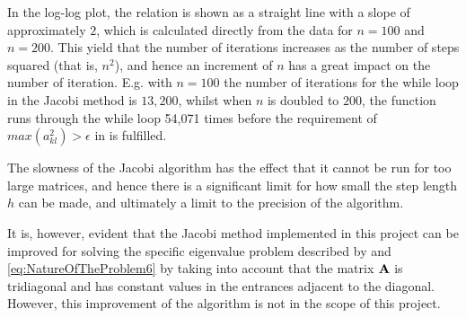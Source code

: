 In the log-log plot, the relation is shown as a straight line with a slope of approximately $2$, which is calculated directly from the data for $n=100$ and $n=200$.
This yield that the number of iterations increases as the number of steps squared (that is, $n^2$), and hence an increment of $n$ has a great impact on the number of iteration. 
E.g. with $n=100$ the number of iterations for the while loop in the Jacobi method is $13,200$, whilst when $n$ is doubled to $200$, the function runs through the while loop 54,071 times before the requirement of $max(a_{kl}^2) > \epsilon$ in  is fulfilled. 

The slowness of the Jacobi algorithm has the effect that it cannot be run for too large matrices, and hence there is a significant limit for how small the step length $h$ can be made, and ultimately a limit to the precision of the algorithm.  

It is, however, evident that the Jacobi method implemented in this project can be improved for solving the specific eigenvalue problem described by  and \eqref{eq:NatureOfTheProblem6} by taking into account that the matrix $\mbox{\textbf{A}}$ is tridiagonal and has constant values in the entrances adjacent to the diagonal.
However, this improvement of the algorithm is not in the scope of this project.